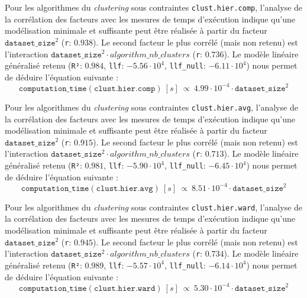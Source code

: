 			Pour les algorithmes du \textit{clustering} sous contraintes \texttt{clust.hier.comp}, l'analyse de la corrélation des facteurs avec les mesures de temps d'exécution indique qu'une modélisation minimale et suffisante peut être réalisée à partir du facteur $\texttt{dataset\_size}^{2}$ (\texttt{r}: $0.938$).
			Le second facteur le plus corrélé (mais non retenu) est l'interaction $\texttt{dataset\_size}^{2} \cdot algorithm\_nb\_clusters$ (\texttt{r}: $0.736$).
			Le modèle linéaire généralisé retenu (\texttt{R²}: $0.984$, \texttt{llf}: $-5.56 \cdot 10^{4}$, \texttt{llf\_null}: $-6.11 \cdot 10^{4}$) nous permet de déduire l'équation suivante :
			\begin{equation}
				\texttt{computation\_time}(\texttt{clust.hier.comp})~[s]~
				\propto~4.99 \cdot 10^{-4} \cdot \texttt{dataset\_size}^{2}
			\end{equation}

			Pour les algorithmes du \textit{clustering} sous contraintes \texttt{clust.hier.avg}, l'analyse de la corrélation des facteurs avec les mesures de temps d'exécution indique qu'une modélisation minimale et suffisante peut être réalisée à partir du facteur $\texttt{dataset\_size}^{2}$ (\texttt{r}: $0.915$).
			Le second facteur le plus corrélé (mais non retenu) est l'interaction $\texttt{dataset\_size}^{2} \cdot algorithm\_nb\_clusters$ (\texttt{r}: $0.713$).
			Le modèle linéaire généralisé retenu (\texttt{R²}: $0.981$, \texttt{llf}: $-5.90 \cdot 10^{4}$, \texttt{llf\_null}: $-6.45 \cdot 10^{4}$) nous permet de déduire l'équation suivante :
			\begin{equation}
				\texttt{computation\_time}(\texttt{clust.hier.avg})~[s]~
				\propto~8.51 \cdot 10^{-4} \cdot \texttt{dataset\_size}^{2}
			\end{equation}

			Pour les algorithmes du \textit{clustering} sous contraintes \texttt{clust.hier.ward}, l'analyse de la corrélation des facteurs avec les mesures de temps d'exécution indique qu'une modélisation minimale et suffisante peut être réalisée à partir du facteur $\texttt{dataset\_size}^{2}$ (\texttt{r}: $0.945$).
			Le second facteur le plus corrélé (mais non retenu) est l'interaction $\texttt{dataset\_size}^{2} \cdot algorithm\_nb\_clusters$ (\texttt{r}: $0.734$).
			Le modèle linéaire généralisé retenu (\texttt{R²}: $0.989$, \texttt{llf}: $-5.57 \cdot 10^{4}$, \texttt{llf\_null}: $-6.14 \cdot 10^{4}$) nous permet de déduire l'équation suivante :
			\begin{equation}
				\texttt{computation\_time}(\texttt{clust.hier.ward})~[s]~
				\propto~5.30 \cdot 10^{-4} \cdot \texttt{dataset\_size}^{2}
			\end{equation}
			
